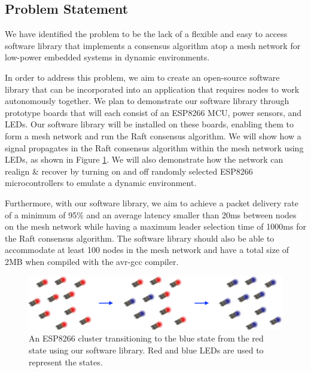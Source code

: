 \subsection{Problem Statement}

We have identified the problem to be the lack of a flexible and easy to access software library that implements a consensus algorithm atop a mesh network for low-power embedded systems in dynamic environments.


In order to address this problem, we aim to create an open-source software library that can be incorporated into an application that requires nodes to work autonomously together. We plan to demonstrate our software library through prototype boards that will each consist of an ESP8266 MCU, power sensors, and LEDs. Our software library will be installed on these boards, enabling them to form a mesh network and run the Raft consensus algorithm. We will show how a signal propagates in the Raft consensus algorithm within the mesh network using LEDs, as shown in Figure \ref{fig:mesh_signal_propagation}. We will also demonstrate how the network can realign \& recover by turning on and off randomly selected ESP8266 microcontrollers to emulate a dynamic environment.

Furthermore, with our software library, we aim to achieve a packet delivery rate of a minimum of 95\% and an average latency smaller than 20ms between nodes on the mesh network while having a maximum leader selection time of 1000ms for the Raft consensus algorithm. The software library should also be able to accommodate at least 100 nodes in the mesh network and have a total size of 2MB when compiled with the avr-gcc compiler.

\begin{figure}[H]
    \centering
    \includegraphics[width=0.8\columnwidth]{images/mesh_signal_propagation.png}
    \caption{An ESP8266 cluster transitioning to the blue state from the red state using our software library. Red and blue LEDs are used to represent the states.}
    \label{fig:mesh_signal_propagation}
\end{figure}


